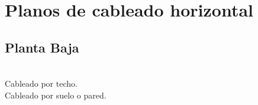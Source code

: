 \section{Planos de cableado horizontal}
\subsection{Planta Baja}
\centerline{\noindent}%
\vspace{4cm}\\
\quad Cableado por techo.\\
\quad Cableado por suelo o pared.\\
\newpage
